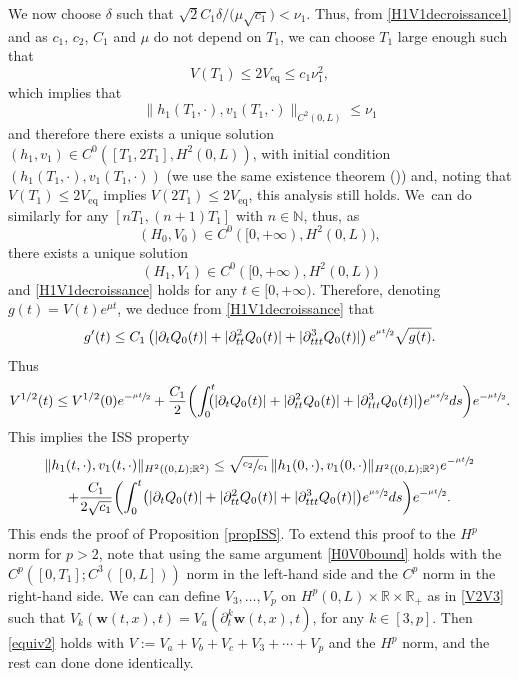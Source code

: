 \documentclass[JEP,XML,SOM,Unicode]{cedram}
\theoremstyle{definition}
\begin{document}
We now choose $\delta$ such that \hbox{${\sqrt{2}C_{1}\delta/(\mu \sqrt{c_{1}}})\!<\!\nu_{1}$}. Thus,
from \eqref{H1V1decroissance1} and as $c_{1}$, $c_{2}$, $C_{1}$ and $\mu$ do not depend on $T_{1}$, we can choose $T_{1}$ large enough such that
\begin{equation*}
V(T_{1})\leq 2V_\mathrm{eq}\leq c_{1}\nu_{1}^{2},
\end{equation*}
which implies that
\begin{equation*}
\lVert h_{1}(T_{1},\cdot),v_{1}(T_{1},\cdot)\rVert_{C^{2}(0,L)}\leq \nu_{1}
\end{equation*}
and therefore there exists a unique solution $(h_{1},v_{1})\!\in\! C^{0}([T_{1},2T_{1}],H^{2}(0,L))$, with initial condition $(h_{1}(T_{1},\cdot),v_{1}(T_{1},\cdot))$ (we use the same existence theorem (\cite[Th.\,2.1]{Wang})) and,
noting that $V(T_{1})\leq 2V_\mathrm{eq}$ implies $V(2T_{1})\leq 2V_\mathrm{eq}$,
this analysis still holds.
We~can do similarly for any $[nT_{1},(n+1)T_{1}]$ with $n\in\mathbb{N}$, thus, as
\[
(H_{0},V_{0})\in C^{0}([0,+\infty),H^{2}(0,L)),
\]
there exists a unique solution
\[
(H_{1},V_{1})\in C^{0}([0,+\infty),H^{2}(0,L))
\]
and \eqref{H1V1decroissance} holds for any $t\in[0,+\infty)$.
Therefore, denoting $g(t)=V(t)e^{\mu t}$,
we deduce from \eqref{H1V1decroissance} that
\begin{equation}
\label{ISS0}
g'(t)\leq C_{1}\left(|\partial_{t}Q_{0}(t)|+|\partial_{tt}^{2}Q_{0}(t)|+|\partial_{ttt}^{3}Q_{0}(t)|\right)e^{\sfrac{\mu t}{2}}\sqrt{g(t)}.
\end{equation}
Thus
\begin{equation*}
V^{1/2}(t)\leq V^{1/2}(0)e^{-\sfrac{\mu t}{2}}+\frac{C_{1}}{2} \biggl(\int_{0}^{t}\hspace*{-2mm}\bigl(|\partial_{t}Q_{0}(t)|+|\partial_{tt}^{2}Q_{0}(t)|+|\partial_{ttt}^{3}Q_{0}(t)|\bigr)e^{\sfrac{\mu s}{2}}ds\biggr)e^{-\sfrac{\mu t}{2}}.
\end{equation*}
This implies the ISS property
\begin{multline}
\label{eqISS}
\lVert h_{1}(t,\cdot),v_{1}(t,\cdot)\rVert_{H^{2}((0,L);\mathbb{R}^{2})}\leq \sqrt{\sfrac{c_{2}}{c_{1}}}\,\lVert h_{1}(0,\cdot),v_{1}(0,\cdot)\rVert_{H^{2}((0,L);\mathbb{R}^{2})}e^{-\sfrac{\mu t}{2}}\\
+\frac{C_{1}}{2\sqrt{c_{1}}}\biggl(\int_{0}^{t}\bigl(|\partial_{t}Q_{0}(t)|+|\partial_{tt}^{2}Q_{0}(t)|+|\partial_{ttt}^{3}Q_{0}(t)|\bigl)e^{\sfrac{\mu s}{2}}ds \biggr)e^{-\sfrac{\mu t}{2}}.
\end{multline}
This ends the proof of Proposition \ref{propISS}.
To extend this proof to the $H^{p}$ norm for $p>2$, note that using the same argument
\eqref{H0V0bound} holds with the $C^{p}([0,T_{1}];C^{3}([0,L]))$ norm in the left-hand side and the $C^{p}$ norm in the right-hand side.
We can can define $V_{3},\dots,V_{p}$ on $H^{p}(0,L)\times\mathbb{R}\times\mathbb{R}_{+}$ as in \eqref{V2V3} such that $V_{k}(\boldsymbol{w}(t,x),t)=V_{a}(\partial_{t}^{k}\boldsymbol{w}(t,x),t)$, for any $k\in[3,p]$.
Then \eqref{equiv2} holds with $V:=V_{a}+V_{b}+V_{c}+V_{3}+\cdots+ V_{p}$ and the $H^{p}$ norm, and the rest can done done identically.
\end{document}
